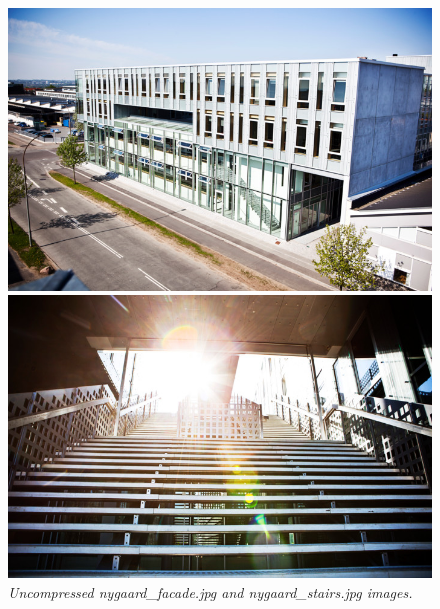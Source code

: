 \documentclass[a4paper,10pt,article,oneside,english]{memoir}
\let\oldcaption\caption
\renewcommand{\caption}[1]{\oldcaption{\emph{#1}}}
\begin{document}
\begin{figure}
	\centering
	\begin{minipage}{.48\textwidth}
		\includegraphics[width=\textwidth]{nygaard_facade.png}
	\end{minipage}
	\hfill
	\begin{minipage}{.48\textwidth}
		\includegraphics[width=\textwidth]{nygaard_stairs.png}
	\end{minipage}
	\caption{Uncompressed \emph{nygaard\_facade.jpg} and \emph{nygaard\_stairs.jpg} images.}
	\label{fig:uncomp}
\end{figure}
\end{document}
